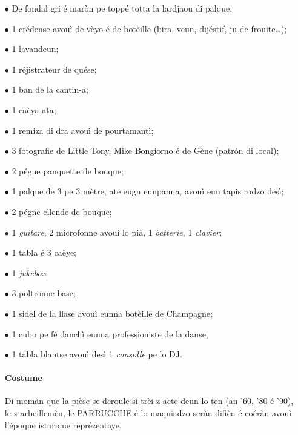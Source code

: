 \Scenographie
\begin{itemize}
\item[$\bullet$] De fondal gri é maròn pe toppé totta la lardjaou di palque;
\item[$\bullet$] 1 crédense avouì de vèyo é de botèille (bira, veun, dijéstif, ju de frouite\ldots);
\item[$\bullet$] 1 lavandeun;
\item[$\bullet$] 1 réjistrateur de quése;
\item[$\bullet$] 1 ban de la cantin-a;
\item[$\bullet$] 1 caèya ata;
\item[$\bullet$] 1 remiza di dra avouì de pourtamantì;
\item[$\bullet$] 3 fotografie de Little Tony, Mike Bongiorno é de Gène (patr\'on di local);
\item[$\bullet$] 2 pégne panquette de bouque;
\item[$\bullet$] 1 palque de 3 pe 3 mètre, ate eugn eunpanna, avouì eun tapis rodzo desì;
\item[$\bullet$] 2 pégne cllende de bouque;
\item[$\bullet$] 1 \textit{guitare}, 2 microfonne avouì lo pià, 1 \textit{batterie}, 1 \textit{clavier};
\item[$\bullet$] 1 tabla é 3 caèye;
\item[$\bullet$] 1 \textit{jukebox};
\item[$\bullet$] 3 poltronne base;
\item[$\bullet$] 1 sidel de la llase avouì eunna botèille de Champagne;
\item[$\bullet$] 1 cubo pe fé danchì eunna professioniste de la danse;
\item[$\bullet$] 1 tabla blantse avouì desì 1 \textit{consolle} pe lo DJ. 

\paragraph*{Costume} Di momàn que la pièse se deroule si trèi-z-acte deun lo ten (an '60, '80 é '90), le-z-arbeillemèn, le PARRUCCHE é lo maquiadzo seràn difièn é coéràn avouì l'époque istorique reprézentaye.


\end{itemize}

\setlength{\lengthchar}{3.125cm}


